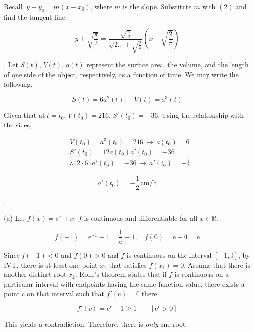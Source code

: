 \documentclass{article}
\begin{document}
\hfill

\noindent Recall: $y-y_0 = m(x-x_0)$, where $m$ is the slope. Substitute $m$ with $(2)$ and find the tangent line.

\[\boxed{y+\sqrt{\frac{\pi}{2}}=\frac{\displaystyle\sqrt{\frac{\pi}{2}}}{\displaystyle\sqrt{2\pi}+\sqrt{\frac{2}{\pi}}}\left(x-\sqrt{\frac{2}{\pi}}\right)}\]

\hfill

. Let $S(t),\, V(t),\, a(t)$ represent the surface area, the volume, and the length of one side of the object, respectively, as a function of time. We may write the following.

\[S(t)=6a^2(t),\quad V(t)=a^3(t)\]

\hfill

\noindent Given that at $t=t_0$, $V(t_0) = 216, \,S'(t_0)=-36$. Using the relationship with the sides,

\begin{align*}
&V(t_0) = a^3(t_0)= 216\,\rightarrow\, a(t_0) = 6\\
&S'(t_0) = 12a(t_0)a'(t_0)=-36\\
&\therefore 12\cdot6\cdot a'(t_0)=-36 \,\rightarrow\, a'(t_0)=-\frac12
\end{align*}

\[\boxed{a'(t_0) = -\frac12\,\text{cm/h}}\]

\newpage

.

\hfill

\noindent (a) Let $f(x) = \mathrm{e}^x + x$. $f$ is continuous and differentiable for all $x\in\mathbb{R}$.

\[f(-1)=\mathrm{e}^{-1}-1=\frac1{\mathrm{e}}-1,\quad f(0)=\mathrm{e}-0=\mathrm{e}\]

\hfill

\noindent Since $f(-1) < 0$ and $f(0) > 0$ and $f$ is continuous on the interval $[-1, 0]$, by IVT, there is at least one point $x_1$ that satisfies $f(x_1) = 0$. Assume that there is another distinct root $x_2$. Rolle's theorem states that if $f$ is continuous on a particular interval with endpoints having the same function value, there exists a point $c$ on that interval such that $f'(c) = 0$ there.

\[f'(c)=\mathrm{e}^c+1\geq1\qquad\left[\mathrm{e}^c>0\right]\]

\hfill

\noindent This yields a contradiction. Therefore, there is \textit{only} one root.
\end{document}
